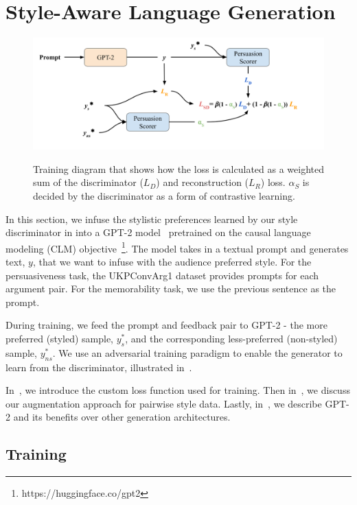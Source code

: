 \section{Style-Aware Language Generation}
\label{sec_generator}

\begin{figure}[ht]
  \centering
  \caption{Training diagram that shows how the loss is calculated as a weighted sum of the discriminator ($L_{D}$) and reconstruction ($L_{R}$) loss. $\alpha_S$ is decided by the discriminator as a form of contrastive learning.}
  \includegraphics[width=0.9\linewidth]{figs/Architecture.png}
  \label{fig:architecture}
  \vspace{-5pt}
\end{figure}

In this section, we infuse the stylistic preferences learned by our style discriminator in  into a GPT-2 model~\citep{radford2019language} pretrained on the causal language modeling (CLM) objective~\footnote{https://huggingface.co/gpt2}. The model takes in a textual prompt and generates text, $y$, that we want to infuse with the audience preferred style. For the persuasiveness task, the UKPConvArg1 dataset provides prompts for each argument pair. For the memorability task, we use the previous sentence as the prompt.

During training, we feed the prompt and feedback pair to GPT-2 - the more preferred (styled) sample, $y^*_s$, and the corresponding less-preferred (non-styled) sample, $y^*_{ns}$. We use an adversarial training paradigm to enable the generator to learn from the discriminator, illustrated in~. 

In~, we introduce the custom loss function used for training. Then in~, we discuss our augmentation approach for pairwise style data. Lastly, in~, we describe GPT-2 and its benefits over other generation architectures.

\subsection{Training}
\label{subsec:si_training}

